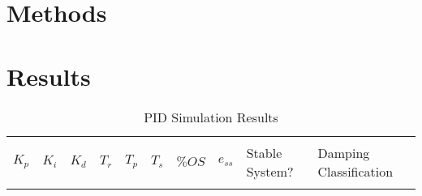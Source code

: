 \documentclass[main.tex]{subfile}
\begin{document}
\section{Methods} 
\label{sec:methods}

\section{Results} 
\label{sec:results}

\begin{table}[H]
	\begin{tabularx}{\textwidth}{llllllllll}
		\toprule
		\\ $K_p$ & $K_i$ & $K_d$ & $T_r$ & $T_p$ & $T_s$ & $\%OS$ & $e_{ss}$ 
		& Stable System? & Damping Classification

		\\ \midrule
		
		\\ \bottomrule
	\end{tabularx}
	\caption{PID Simulation Results}
	\label{tab:pidSimResults}
\end{table}


\end{document}
